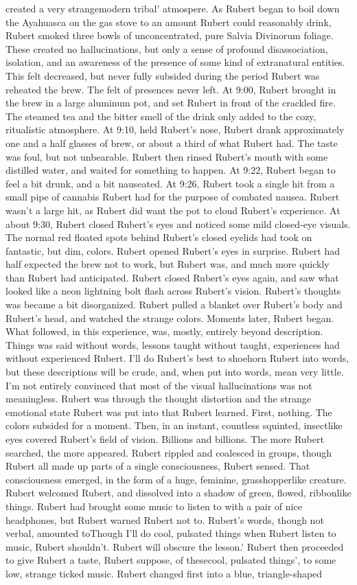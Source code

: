 \documentclass[12pt]{book}
\begin{document}
created a very strangemodern tribal' atmospere. As Rubert began to boil down the Ayahuasca on the gas stove to an amount Rubert could reasonably drink, Rubert smoked three bowls of unconcentrated, pure Salvia Divinorum foliage. These created no hallucinations, but only a sense of profound disassociation, isolation, and an awareness of the presence of some kind of extranatural entities. This felt decreased, but never fully subsided during the period Rubert was reheated the brew. The felt of presences never left. At 9:00, Rubert brought in the brew in a large aluminum pot, and set Rubert in front of the crackled fire. The steamed tea and the bitter smell of the drink only added to the cozy, ritualistic atmosphere. At 9:10, held Rubert's nose, Rubert drank approximately one and a half glasses of brew, or about a third of what Rubert had. The taste was foul, but not unbearable. Rubert then rinsed Rubert's mouth with some distilled water, and waited for something to happen. At 9:22, Rubert began to feel a bit drunk, and a bit nauseated. At 9:26, Rubert took a single hit from a small pipe of cannabis Rubert had for the purpose of combated nausea. Rubert wasn't a large hit, as Rubert did want the pot to cloud Rubert's experience. At about 9:30, Rubert closed Rubert's eyes and noticed some mild closed-eye visuals. The normal red floated spots behind Rubert's closed eyelids had took on fantastic, but dim, colors. Rubert opened Rubert's eyes in surprise. Rubert had half expected the brew not to work, but Rubert was, and much more quickly than Rubert had anticipated. Rubert closed Rubert's eyes again, and saw what looked like a neon lightning bolt flash across Rubert's vision. Rubert's thoughts was became a bit disorganized. Rubert pulled a blanket over Rubert's body and Rubert's head, and watched the strange colors. Moments later, Rubert began. What followed, in this experience, was, mostly, entirely beyond description. Things was said without words, lessons taught without taught, experiences had without experienced Rubert. I'll do Rubert's best to shoehorn Rubert into words, but these descriptions will be crude, and, when put into words, mean very little. I'm not entirely convinced that most of the visual hallucinations was not meaningless. Rubert was through the thought distortion and the strange emotional state Rubert was put into that Rubert learned. First, nothing. The colors subsided for a moment. Then, in an instant, countless squinted, insectlike eyes covered Rubert's field of vision. Billions and billions. The more Rubert searched, the more appeared. Rubert rippled and coalesced in groups, though Rubert all made up parts of a single consciousness, Rubert sensed. That consciousness emerged, in the form of a huge, feminine, grasshopperlike creature. Rubert welcomed Rubert, and dissolved into a shadow of green, flowed, ribbonlike things. Rubert had brought some music to listen to with a pair of nice headphones, but Rubert warned Rubert not to. Rubert's words, though not verbal, amounted toThough I'll do cool, pulsated things when Rubert listen to music, Rubert shouldn't. Rubert will obscure the lesson.' Rubert then proceeded to give Rubert a taste, Rubert suppose, of thesecool, pulsated things', to some low, strange ticked music. Rubert changed first into a blue, triangle-shaped 
\end{document}
